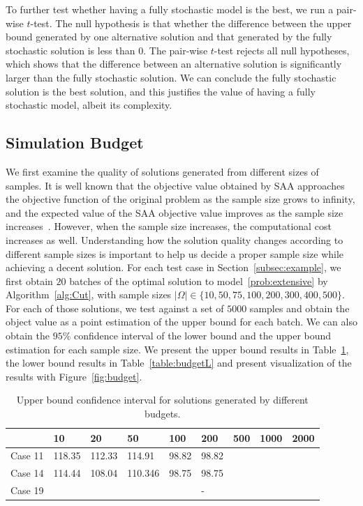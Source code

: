 \documentclass[11pt]{article}
\begin{document}
	To further test whether having a fully stochastic model is the best, we run a pair-wise \(t\)-test. The null hypothesis is that whether the difference between the upper bound generated by one alternative solution and that generated by the fully stochastic solution is less than 0. The pair-wise \(t\)-test rejects all null hypotheses, which shows that the difference between an alternative solution is significantly larger than the fully stochastic solution. We can conclude the fully stochastic solution is the best solution, and this justifies the value of having a fully stochastic model, albeit its complexity.
	\subsection{Simulation Budget} \label{subsec:budget}
	We first examine the quality of solutions generated from different sizes of samples. It is well known that the objective value obtained by SAA approaches the objective function of the original problem as the sample size grows to infinity, and the expected value of the SAA objective value improves as the sample size increases~\cite{shapiro2009lectures}. However, when the sample size increases, the computational cost increases as well. Understanding how the solution quality changes according to different sample sizes is important to help us decide a proper sample size while achieving a decent solution. For each test case in Section~\ref{subsec:example}, we first obtain \(20\) batches of the optimal solution to model~\ref{prob:extensive} by Algorithm~\ref{alg:Cut}, with sample sizes \(|\Omega| \in \{10, 50, 75, 100, 200, 300, 400, 500\}\). For each of those solutions, we test against a set of \(5000\) samples and obtain the object value as a point estimation of the upper bound for each batch. We can also obtain the \(95\%\) confidence interval of the lower bound and the upper bound estimation for each sample size. We present the upper bound results in Table~\ref{table:budgetU}, the lower bound results in Table~\ref{table:budgetL} and present visualization of the results with Figure~\ref{fig:budget}.
	\begin{table}[H]
		\centering
		\begin{tabular}{ c | l l l l l l l l}
			\hline
			& 10 & 20 & 50 & 100 & 200 & 500 & 1000 & 2000 \\ \hline
			Case 11& 118.35 & 112.33 & 114.91 & 98.82 & 98.82 & & \\
			Case 14 & 114.44 & 108.04 & 110.346 & 98.75 & 98.75 & &  \\
			Case 19 & & & &  & - & & \\
			\hline
		\end{tabular}
		\caption{Upper bound confidence interval for solutions generated by different budgets.}
		\label{table:budgetU}
	\end{table}
	
\end{document}
